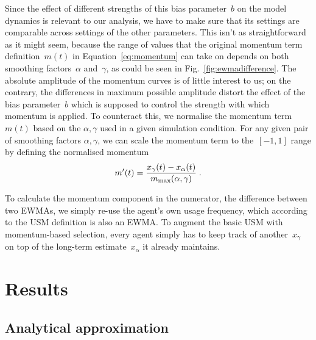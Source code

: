Since the effect of different strengths of this bias parameter~$b$ on the model dynamics is relevant to our analysis, we have to make sure that its settings are comparable across settings of the other parameters. This isn't as straightforward as it might seem, because the range of values that the original momentum term definition~$m(t)$ in Equation~\ref{eq:momentum} can take on depends on both smoothing factors~$\alpha$ and~$\gamma$, as could be seen in Fig.~\ref{fig:ewmadifference}. The absolute amplitude of the momentum curves is of little interest to us; on the contrary, the differences in maximum possible amplitude distort the effect of the bias parameter~$b$ which is supposed to control the strength with which momentum is applied. To counteract this, we normalise the momentum term~$m(t)$ based on the $\alpha, \gamma$ used in a given simulation condition. For any given pair of smoothing factors $\alpha, \gamma$, we can scale the momentum term to the~$[-1,1]$ range by defining the normalised momentum
\begin{equation}
m'(t)=\frac{x_\gamma(t) - x_\alpha(t)}{m_{\rm max}(\alpha, \gamma)}\;.
\label{eq:normalisedmomentum}
\end{equation}

To calculate the momentum component in the numerator, the difference between two EWMAs, we simply re-use the agent's own usage frequency, which according to the USM definition is also an EWMA. To augment the basic USM with momentum-based selection, every agent simply has to keep track of another~$x_\gamma$ on top of the long-term estimate~$x_\alpha$ it already maintains.


\section{Results}

\subsection{Analytical approximation}

